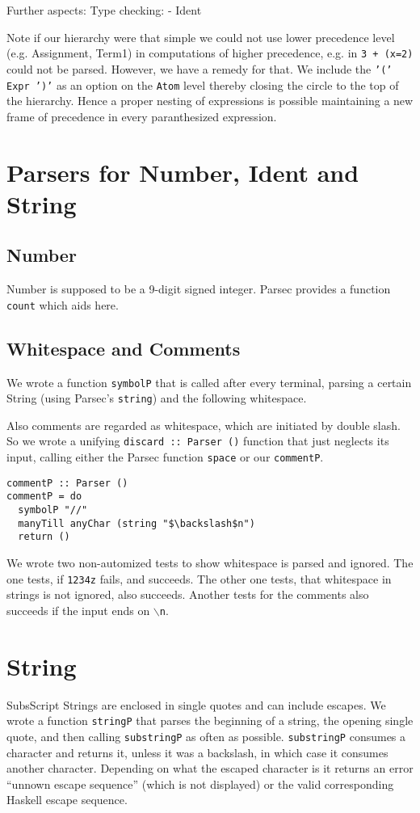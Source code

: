 \documentclass{article}
\begin{document}
Further aspects:
Type checking:
- Ident 

Note if our hierarchy were that simple we could not use lower precedence level (e.g. Assignment, Term1) in computations of higher precedence, e.g. in \texttt{3 + (x=2)}
could not be parsed. However, we have a remedy for that. We include the \texttt{'(' Expr ')'} as an option on the \texttt{Atom} level thereby closing the circle to the top of the
hierarchy. Hence a proper nesting of expressions is possible maintaining a new frame of precedence in every paranthesized expression.


\section{Parsers for Number, Ident and String}

\subsection{Number}
Number is supposed to be a 9-digit signed integer. Parsec provides a function \texttt{count} which aids here.

\subsection{Whitespace and Comments}
We wrote a function \texttt{symbolP} that is called after every terminal, parsing a certain String (using Parsec's \texttt{string}) and the following whitespace.

Also comments are regarded as whitespace, which are initiated by double slash.
So we wrote a unifying \texttt{discard :: Parser ()} function that just neglects its input, calling either the Parsec function \texttt{space} or our \texttt{commentP}.

\begin{lstlisting}[mathescape]
commentP :: Parser ()
commentP = do
  symbolP "//"
  manyTill anyChar (string "$\backslash$n")
  return ()
\end{lstlisting}

We wrote two non-automized tests to show whitespace is parsed and ignored.
The one tests, if \texttt{1234z} fails, and succeeds.
The other one tests, that whitespace in strings is not ignored, also succeeds.
Another tests for the comments also succeeds if the input ends on \texttt{$\backslash$n}.

\section{String}
SubsScript Strings are enclosed in single quotes and can include escapes.
We wrote a function \texttt{stringP} that parses the beginning of a string, the opening single quote,
and then calling \texttt{substringP} as often as possible.
\texttt{substringP} consumes a character and returns it, unless it was a backslash,
in which case it consumes another character. Depending on what the escaped character is
it returns an error ``unnown escape sequence'' (which is not displayed) or the valid
corresponding Haskell escape sequence.
\end{document}
